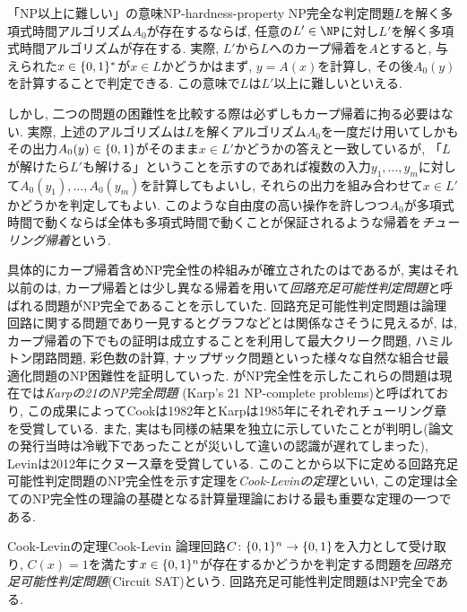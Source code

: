 \begin{remark}{「NP以上に難しい」の意味}{NP-hardness-property}
NP完全な判定問題$L$を解く多項式時間アルゴリズム$A_0$が存在するならば, 任意の$L'\in \NP$に対し$L'$を解く多項式時間アルゴリズムが存在する.
実際, $L'$から$L$へのカープ帰着を$A$とすると, 与えられた$x\in\{0,1\}^*$が$x\in L$かどうかはまず, $y=A(x)$を計算し, その後$A_0(y)$を計算することで判定できる.
この意味で$L$は$L'$以上に難しいといえる.

しかし, 二つの問題の困難性を比較する際は必ずしもカープ帰着に拘る必要はない.
実際, 上述のアルゴリズムは$L$を解くアルゴリズム$A_0$を一度だけ用いてしかもその出力$A_0(y)\in\{0,1\}$がそのまま$x\in L'$かどうかの答えと一致しているが, 「$L$が解けたら$L'$も解ける」ということを示すのであれば複数の入力$y_1,\dots,y_m$に対して$A_0(y_1),\dots,A_0(y_m)$を計算してもよいし, それらの出力を組み合わせて$x\in L'$かどうかを判定してもよい.
このような自由度の高い操作を許しつつ$A_0$が多項式時間で動くならば全体も多項式時間で動くことが保証されるような帰着を\emph{チューリング帰着}という.
\end{remark}

具体的にカープ帰着含めNP完全性の枠組みが確立されたのは\citet{Karp1972}であるが,
実はそれ以前の\citet{Cook1971}は, カープ帰着とは少し異なる帰着を用いて\emph{回路充足可能性判定問題}と呼ばれる問題がNP完全であることを示していた. 
回路充足可能性判定問題は論理回路に関する問題であり一見するとグラフなどとは関係なさそうに見えるが,
\citet{Karp1972}は, カープ帰着の下でも\cite{Cook1971}の証明は成立することを利用して最大クリーク問題, ハミルトン閉路問題, 彩色数の計算, ナップザック問題といった様々な自然な組合せ最適化問題のNP困難性を証明していった.
\citet{Karp1972}がNP完全性を示したこれらの問題は現在では\emph{Karpの21のNP完全問題} (Karp's 21 NP-complete problems)と呼ばれており,
この成果によってCookは1982年とKarpは1985年にそれぞれチューリング章を受賞している.
また, 実は\citet{Levin1973}も同様の結果を独立に示していたことが判明し(論文の発行当時は冷戦下であったことが災いして違いの認識が遅れてしまった), Levinは2012年にクヌース章を受賞している.
このことから以下に定める回路充足可能性判定問題のNP完全性を示す定理を\emph{Cook-Levinの定理}といい,
この定理は全てのNP完全性の理論の基礎となる計算量理論における最も重要な定理の一つである.

\begin{theorem}{Cook-Levinの定理}{Cook-Levin}
  論理回路$C\colon\{0,1\}^n\to\{0,1\}$を入力として受け取り, $C(x)=1$を満たす$x\in\{0,1\}^n$が存在するかどうかを判定する問題を\emph{回路充足可能性判定問題}(Circuit SAT)という.
  回路充足可能性判定問題はNP完全である.
\end{theorem}


